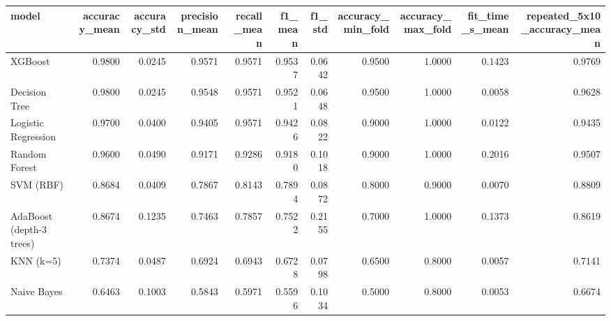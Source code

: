 \begin{tabular}{lrrrrrrrrrr}
\toprule
model & accuracy_mean & accuracy_std & precision_mean & recall_mean & f1_mean & f1_std & accuracy_min_fold & accuracy_max_fold & fit_time_s_mean & repeated_5x10_accuracy_mean \\
\midrule
XGBoost & 0.9800 & 0.0245 & 0.9571 & 0.9571 & 0.9537 & 0.0642 & 0.9500 & 1.0000 & 0.1423 & 0.9769 \\
Decision Tree & 0.9800 & 0.0245 & 0.9548 & 0.9571 & 0.9521 & 0.0648 & 0.9500 & 1.0000 & 0.0058 & 0.9628 \\
Logistic Regression & 0.9700 & 0.0400 & 0.9405 & 0.9571 & 0.9426 & 0.0822 & 0.9000 & 1.0000 & 0.0122 & 0.9435 \\
Random Forest & 0.9600 & 0.0490 & 0.9171 & 0.9286 & 0.9180 & 0.1018 & 0.9000 & 1.0000 & 0.2016 & 0.9507 \\
SVM (RBF) & 0.8684 & 0.0409 & 0.7867 & 0.8143 & 0.7894 & 0.0872 & 0.8000 & 0.9000 & 0.0070 & 0.8809 \\
AdaBoost (depth-3 trees) & 0.8674 & 0.1235 & 0.7463 & 0.7857 & 0.7522 & 0.2155 & 0.7000 & 1.0000 & 0.1373 & 0.8619 \\
KNN (k=5) & 0.7374 & 0.0487 & 0.6924 & 0.6943 & 0.6728 & 0.0798 & 0.6500 & 0.8000 & 0.0057 & 0.7141 \\
Naive Bayes & 0.6463 & 0.1003 & 0.5843 & 0.5971 & 0.5596 & 0.1034 & 0.5000 & 0.8000 & 0.0053 & 0.6674 \\
\bottomrule
\end{tabular}
